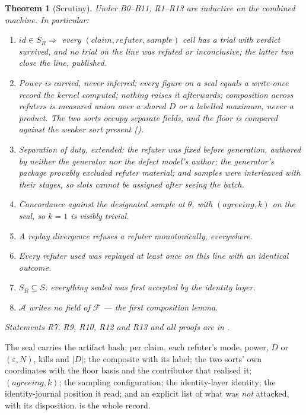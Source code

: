 \documentclass[11pt,a4paper]{article}
\theoremstyle{plain}
\newtheorem{theorem}{Theorem}
\theoremstyle{definition}
\theoremstyle{remark}
\newcommand{\SR}{\ensuremath{S_R}}
\begin{document}
\begin{theorem}[Scrutiny]
\label{thm:scrutiny}
Under B0--B11, R1--R13 are inductive on the combined machine. In particular:
\begin{enumerate}[label=\textup{R\arabic*},leftmargin=2.4em,itemsep=1pt]
  \item $\mathit{id} \in \SR \Rightarrow$ every $(\mathit{claim}, \mathit{refuter}, \mathit{sample})$ cell has a trial with verdict \emph{survived}, and no trial on the line was refuted or inconclusive; the latter two close the line, published.
  \item Power is carried, never inferred: every figure on a seal equals a write-once record the kernel computed; nothing raises it afterwards; composition across refuters is measured union over a shared $D$ or a labelled maximum, never a product. The two sorts occupy separate fields, and the floor is compared against the \emph{weaker} sort present ().
  \item Separation of duty, extended: the refuter was fixed before generation, authored by neither the generator nor the defect model's author; the generator's package provably excluded refuter material; and samples were interleaved with their stages, so slots cannot be assigned after seeing the batch.
  \item[R4] Concordance against the designated sample at $\theta$, with $(\mathit{agreeing},k)$ on the seal, so $k=1$ is visibly trivial.
  \item[R5] A replay divergence refuses a refuter monotonically, everywhere.
  \item[R6] Every refuter used was replayed at least once on this line with an identical outcome.
  \item[R8] $\SR \subseteq S$: everything sealed was first accepted by the identity layer.
  \item[R11] $\mathcal{A}$ writes no field of $\mathcal{F}$ --- the first composition lemma.
\end{enumerate}
Statements R7, R9, R10, R12 and R13 and all proofs are in .
\end{theorem}

The seal carries the artifact hash; per claim, each refuter's mode, power, $D$ or $(\varepsilon,N)$, kills and $|D|$; the composite with its label; the two sorts' own coordinates with the floor basis and the contributor that realised it; $(\mathit{agreeing},k)$; the sampling configuration; the identity-layer identity; the identity-journal position it read; and an explicit list of what was \emph{not} attacked, with its disposition.  is the whole record.
\end{document}
